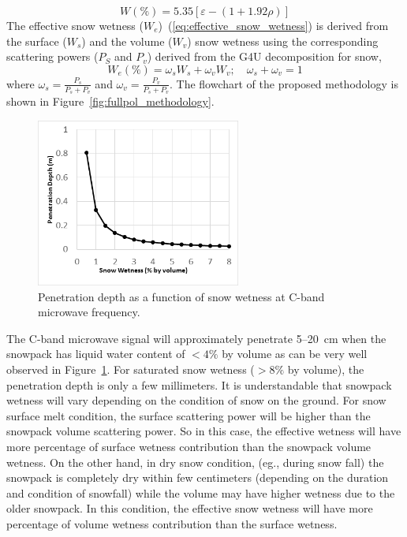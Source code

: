\begin{equation}
W(\%) = 5.35[\varepsilon -(1+1.92\rho)]
\label{eq:wetness}
\end{equation} 
The effective snow wetness ($W_e$)~(\ref{eq:effective_snow_wetness}) is derived from the surface ($W_s$) and the volume ($W_v$) snow wetness using the corresponding scattering powers ($P_S$ and $P_v$) derived from the G4U decomposition for snow, 
\begin{equation}
W_e(\%) = \omega_{s}W_{s} + \omega_{v}W_{v}; \quad \omega_{s}+\omega_{v}=1
\label{eq:effective_snow_wetness}
\end{equation}
where $\omega_{s}=\frac{P_s}{P_s+P_v}$ and $\omega_{v}=\frac{P_v}{P_s+P_v}$. The flowchart of the proposed methodology is shown in Figure~\ref{fig:fullpol_methodology}.
\begin{figure}[!h]
	\centering
	\includegraphics[width=0.6\textwidth]{Figures/plot}
	\caption[Plot of Snow wetness Vs Penetration depth at C-band]{Penetration depth as a function of snow wetness at C-band microwave frequency.}
	\label{fig:penetration_plot}
\end{figure}

The C-band microwave signal will approximately penetrate 5--20~cm when the snowpack has liquid water content of $< 4\%$ by volume as can be very well observed in Figure~\ref{fig:penetration_plot}. For saturated snow wetness ($> 8\%$ by volume), the penetration depth is only a few millimeters. It is understandable that snowpack wetness will vary depending on the condition of snow on the ground. For snow surface melt condition, the surface scattering power will be higher than the snowpack volume scattering power. So in this case, the effective wetness will have more percentage of surface wetness contribution than the snowpack volume wetness. On the other hand, in dry snow condition, (eg., during snow fall) the snowpack is completely dry within few centimeters (depending on the duration and condition of snowfall) while the volume may have higher wetness due to the older snowpack. In this condition, the effective snow wetness will have more percentage of volume wetness contribution than the surface wetness.

